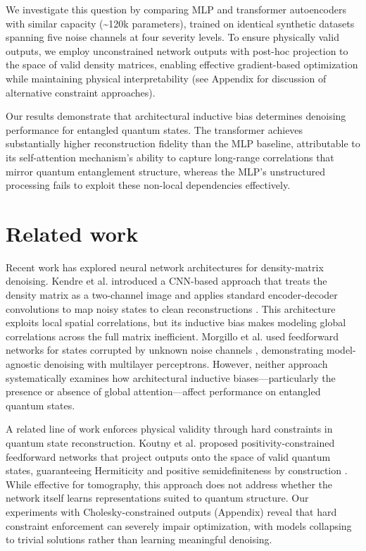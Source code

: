 \documentclass[11pt]{article}
\begin{document}
We investigate this question by comparing MLP and transformer autoencoders with similar capacity (\textasciitilde{}120k parameters), trained on identical synthetic datasets spanning five noise channels at four severity levels. To ensure physically valid outputs, we employ unconstrained network outputs with post-hoc projection to the space of valid density matrices, enabling effective gradient-based optimization while maintaining physical interpretability (see Appendix for discussion of alternative constraint approaches).

Our results demonstrate that architectural inductive bias determines denoising performance for entangled quantum states. The transformer achieves substantially higher reconstruction fidelity than the MLP baseline, attributable to its self-attention mechanism's ability to capture long-range correlations that mirror quantum entanglement structure, whereas the MLP's unstructured processing fails to exploit these non-local dependencies effectively.
\section{Related work}
\label{sec:orgc57bffb}
Recent work has explored neural network architectures for density-matrix denoising. Kendre et al. introduced a CNN-based approach that treats the density matrix as a two-channel image and applies standard encoder-decoder convolutions to map noisy states to clean reconstructions \citep{kendre2025machinelearningquantumnoise}. This architecture exploits local spatial correlations, but its inductive bias makes modeling global correlations across the full matrix inefficient. Morgillo et al. used feedforward networks for states corrupted by unknown noise channels \citep{Morgillo_2024}, demonstrating model-agnostic denoising with multilayer perceptrons. However, neither approach systematically examines how architectural inductive biases—particularly the presence or absence of global attention—affect performance on entangled quantum states.

A related line of work enforces physical validity through hard constraints in quantum state reconstruction. Koutny et al. proposed positivity-constrained feedforward networks that project outputs onto the space of valid quantum states, guaranteeing Hermiticity and positive semidefiniteness by construction \citep{PhysRevA.106.012409}. While effective for tomography, this approach does not address whether the network itself learns representations suited to quantum structure. Our experiments with Cholesky-constrained outputs (Appendix) reveal that hard constraint enforcement can severely impair optimization, with models collapsing to trivial solutions rather than learning meaningful denoising.
\end{document}
